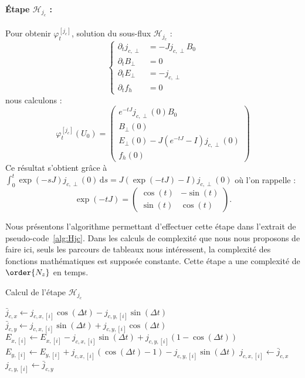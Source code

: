\paragraph{Étape $\mathcal{H}_{j_c}$ :}
Pour obtenir $\varphi_t^{[j_c]}$, solution du sous-flux $\mathcal{H}_{j_c}$ :
$$
  \begin{cases}
    \partial_t j_{c,\perp} &= -Jj_{c,\perp}B_0 \\
    \partial_t B_\perp     &= 0 \\
    \partial_t E_\perp     &= -j_{c,\perp} \\
    \partial_t f_h         &= 0
  \end{cases}
$$
nous calculons :
$$
  \varphi_t^{[j_c]}(U_0) = \begin{pmatrix}
    e^{-tJ}j_{c,\perp}(0)B_0 \\
    B_\perp(0) \\
    E_\perp(0) - J\left(e^{-tJ}-I\right)j_{c,\perp}(0) \\
    f_h(0)
  \end{pmatrix}
$$
Ce résultat s'obtient grâce à $\int_0^t \exp(-sJ)j_{c,\perp}(0)\,\mathrm{d}s = J\left(\exp(-tJ)-I\right)j_{c,\perp}(0)$ où l'on rappelle :
$$
  \exp(-tJ) = \begin{pmatrix}
    \cos(t) & -\sin(t) \\
    \sin(t) &  \cos(t)
  \end{pmatrix}.
$$

Nous présentons l'algorithme permettant d'effectuer cette étape dans l'extrait de pseudo-code~\ref{alg:Hjc}. Dans les calculs de complexité que nous nous proposons de faire ici, seuls les parcours de tableaux nous intéressent, la complexité des fonctions mathématiques est supposée constante. Cette étape a une complexité de $\order{N_z}$ en temps.
\begin{algorithm}
  \caption{Calcul de l'étape $\mathcal{H}_{j_c}$}
  \label{alg:Hjc}
  \begin{algorithmic}[1]
        \State $\bar{j}_{c,x} \gets j_{c,x,[i]}\cos(\Delta t) - j_{c,y,[i]}\sin(\Delta t) $
        \State $\bar{j}_{c,y} \gets j_{c,x,[i]}\sin(\Delta t) + j_{c,y,[i]}\cos(\Delta t) $
        \State $E_{x,[i]}\gets E_{x,[i]} - j_{c,x,[i]}\sin(\Delta t)     + j_{c,y,[i]}(1-\cos(\Delta t))$
        \State $E_{y,[i]}\gets E_{y,[i]} + j_{c,x,[i]}(\cos(\Delta t)-1) - j_{c,y,[i]}\sin(\Delta t)$
        \State $j_{c,x,[i]} \gets \bar{j}_{c,x}$
        \State $j_{c,y,[i]} \gets \bar{j}_{c,y}$
      \EndFor
    \EndFunction
  \end{algorithmic}
\end{algorithm}


